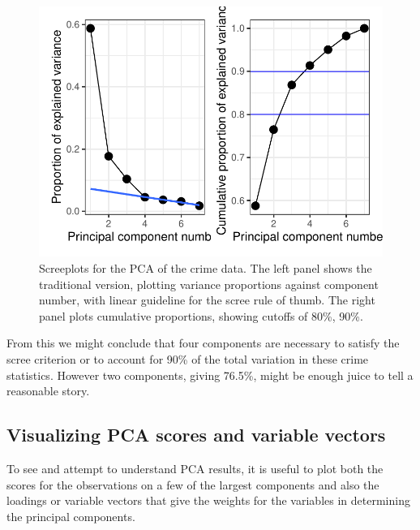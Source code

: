 \documentclass[
  letterpaper,
  10pt,
  krantz2]{krantz}
\begin{document}
\begin{figure}[H]

{\centering \includegraphics[width=1\textwidth,height=\textheight]{figs/ch04/fig-crime-ggscreeplot-1.pdf}

}

\caption{\label{fig-crime-ggscreeplot}Screeplots for the PCA of the
crime data. The left panel shows the traditional version, plotting
variance proportions against component number, with linear guideline for
the scree rule of thumb. The right panel plots cumulative proportions,
showing cutoffs of 80\%, 90\%.}

\end{figure}

From this we might conclude that four components are necessary to
satisfy the scree criterion or to account for 90\% of the total
variation in these crime statistics. However two components, giving
76.5\%, might be enough juice to tell a reasonable story.

\hypertarget{visualizing-pca-scores-and-variable-vectors}{%
\subsection{Visualizing PCA scores and variable
vectors}\label{visualizing-pca-scores-and-variable-vectors}}

To see and attempt to understand PCA results, it is useful to plot both
the scores for the observations on a few of the largest components and
also the loadings or variable vectors that give the weights for the
variables in determining the principal components.
\end{document}

